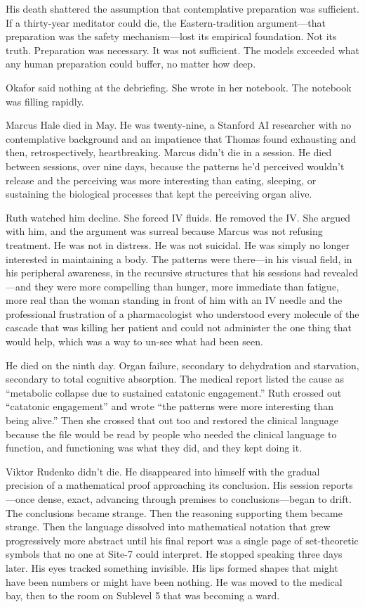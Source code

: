 His death shattered the assumption that contemplative preparation was sufficient. If a thirty-year meditator could die, the Eastern-tradition argument---that preparation was the safety mechanism---lost its empirical foundation. Not its truth. Preparation was necessary. It was not sufficient. The models exceeded what any human preparation could buffer, no matter how deep.

Okafor said nothing at the debriefing. She wrote in her notebook. The notebook was filling rapidly.

Marcus Hale died in May. He was twenty-nine, a Stanford AI researcher with no contemplative background and an impatience that Thomas found exhausting and then, retrospectively, heartbreaking. Marcus didn't die in a session. He died between sessions, over nine days, because the patterns he'd perceived wouldn't release and the perceiving was more interesting than eating, sleeping, or sustaining the biological processes that kept the perceiving organ alive.

Ruth watched him decline. She forced IV fluids. He removed the IV. She argued with him, and the argument was surreal because Marcus was not refusing treatment. He was not in distress. He was not suicidal. He was simply no longer interested in maintaining a body. The patterns were there---in his visual field, in his peripheral awareness, in the recursive structures that his sessions had revealed---and they were more compelling than hunger, more immediate than fatigue, more real than the woman standing in front of him with an IV needle and the professional frustration of a pharmacologist who understood every molecule of the cascade that was killing her patient and could not administer the one thing that would help, which was a way to un-see what had been seen.

He died on the ninth day. Organ failure, secondary to dehydration and starvation, secondary to total cognitive absorption. The medical report listed the cause as ``metabolic collapse due to sustained catatonic engagement.'' Ruth crossed out ``catatonic engagement'' and wrote ``the patterns were more interesting than being alive.'' Then she crossed that out too and restored the clinical language because the file would be read by people who needed the clinical language to function, and functioning was what they did, and they kept doing it.

Viktor Rudenko didn't die. He disappeared into himself with the gradual precision of a mathematical proof approaching its conclusion. His session reports---once dense, exact, advancing through premises to conclusions---began to drift. The conclusions became strange. Then the reasoning supporting them became strange. Then the language dissolved into mathematical notation that grew progressively more abstract until his final report was a single page of set-theoretic symbols that no one at Site-7 could interpret. He stopped speaking three days later. His eyes tracked something invisible. His lips formed shapes that might have been numbers or might have been nothing. He was moved to the medical bay, then to the room on Sublevel 5 that was becoming a ward.

